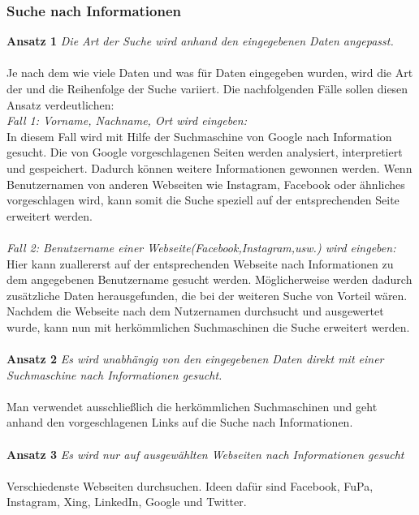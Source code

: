 		\subsubsection{Suche nach Informationen}
		{\bf Ansatz 1} \textit{Die Art der Suche wird anhand den eingegebenen Daten angepasst.}\\\\
		Je nach dem wie viele Daten und was für Daten eingegeben wurden, wird die Art der und die Reihenfolge der Suche variiert. Die nachfolgenden Fälle sollen diesen Ansatz verdeutlichen:\\
		\textit{Fall 1: Vorname, Nachname, Ort wird eingeben:}\\
		In diesem Fall wird mit Hilfe der Suchmaschine von Google nach Information gesucht. Die von Google vorgeschlagenen Seiten werden analysiert, interpretiert und gespeichert. Dadurch können weitere Informationen gewonnen werden. Wenn Benutzernamen von anderen Webseiten wie Instagram, Facebook oder ähnliches vorgeschlagen wird, kann somit die Suche speziell auf der entsprechenden Seite erweitert werden.\\\\
		\textit{Fall 2: Benutzername einer Webseite(Facebook,Instagram,usw.) wird eingeben:}\\
		Hier kann zuallererst auf der entsprechenden Webseite nach Informationen zu dem angegebenen Benutzername gesucht werden. Möglicherweise werden dadurch zusätzliche Daten herausgefunden, die bei der weiteren Suche von Vorteil wären.\\
		Nachdem die Webseite nach dem Nutzernamen durchsucht und ausgewertet wurde, kann nun mit herkömmlichen Suchmaschinen die Suche erweitert werden.\\\\
		{\bf Ansatz 2} \textit{Es wird unabhängig von den eingegebenen Daten direkt mit einer Suchmaschine nach Informationen gesucht.}\\\\
		Man verwendet ausschließlich die herkömmlichen Suchmaschinen und geht anhand den vorgeschlagenen Links auf die Suche nach Informationen.\\\\
		{\bf Ansatz 3} \textit{Es wird nur auf ausgewählten Webseiten nach Informationen gesucht}\\\\
		Verschiedenste Webseiten durchsuchen. Ideen dafür sind Facebook, FuPa, Instagram, Xing, LinkedIn, Google und Twitter.\\
		
